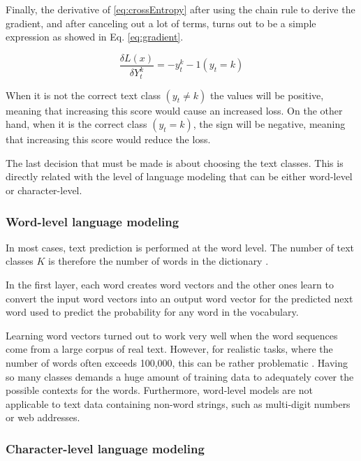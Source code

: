 Finally, the derivative of \ref{eq:crossEntropy} after using the chain rule to derive the gradient, and after canceling out a lot of terms, turns out to be a simple expression as showed in Eq. \ref{eq:gradient}.

\begin{equation} \label{eq:cgradient}
\frac{\delta L(x)}{\delta Y^k_t}=- y^k_t - 1 (y_t=k)
\end{equation}

When it is not the correct text class $(y_t \not= k)$ the values will be positive, meaning that increasing this score would cause an increased loss. On the other hand, when it is the correct class $(y_t = k)$, the sign will be negative, meaning that increasing this score would reduce the loss.


The last decision that must be made is about choosing the text classes. This is directly related with the level of language modeling that can be either word-level or character-level.

\subsubsection{Word-level language modeling}

In most cases, text prediction is performed at the word level. The number of text classes $K$ is therefore the number of words in the dictionary \cite{graves2013generating}.

In the first layer, each word creates word vectors and the other ones learn to convert the input word vectors into an output word vector for the predicted next word used to predict the probability for any word in the vocabulary. 

Learning word vectors turned out to work very well when the word sequences come from a large corpus of real text. However, for realistic tasks, where the number of words often exceeds 100,000, this can be rather problematic \cite{lecun2015deep}. 
 Having so many classes demands a huge amount of training data to adequately cover the possible contexts for the words. Furthermore, word-level models are not applicable to text data containing non-word strings, such as multi-digit numbers or web addresses.\cite{graves2013generating}

\subsubsection{Character-level language modeling}

